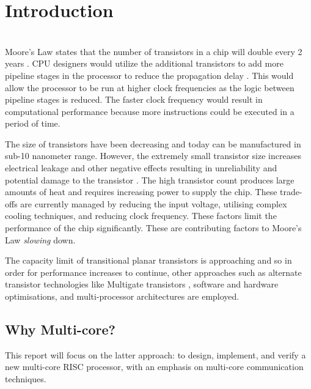 \documentclass[11pt,a4paper]{report}
\begin{document}
\newpage
\renewcommand*\contentsname{Table of Contents}
{%
\tableofcontents

\newpage
\chapter{Introduction}
{%
\startcontents[chapters]
}

\noindent\\
Moore's Law states that the number of transistors in a chip will double every 2 years \cite{}. CPU designers would utilize the  additional transistors to add more pipeline stages in the processor to reduce the propagation delay \cite{}. This would allow the processor to be run at higher clock frequencies as the logic between pipeline stages is reduced. The faster clock frequency would result in computational performance because more instructions could be executed in a period of time.

The size of transistors have been decreasing \cite{} and today can be manufactured in sub-10 nanometer range. However, the extremely small transistor size increases electrical leakage and other negative effects resulting in unreliability and potential damage to the transistor \cite{}.  The high transistor count produces large amounts of heat and requires increasing power to supply the chip. These trade-offs are currently managed by reducing the input voltage, utilising complex cooling techniques, and reducing clock frequency. These factors limit the performance of the chip significantly.
These are contributing factors to Moore's Law \textit{slowing} down.

The capacity limit of transitional planar transistors is approaching and so in order for performance increases to continue, other approaches such as alternate transistor technologies like Multigate transistors \cite{subramanian2010multiple}, software and hardware optimisations, and multi-processor architectures are employed.

\section{Why Multi-core?}
This report will focus on the latter approach: to design, implement, and verify a new multi-core RISC processor, with an emphasis on multi-core communication techniques.

 

}
\end{document}
